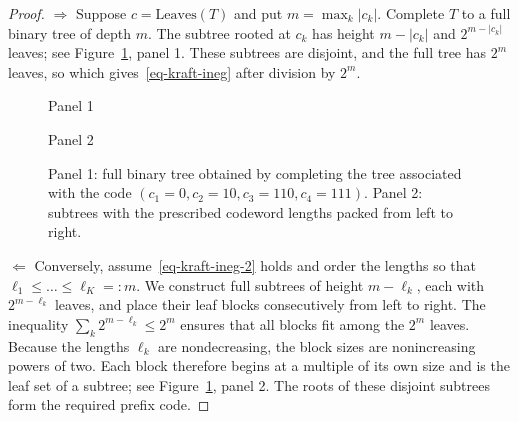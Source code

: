 \begin{proof}
	$\Rightarrow$ Suppose $c=\text{Leaves}(T)$ and put $m=\max_k |c_k|$. Complete $T$ to a full binary tree of depth $m$.
	The subtree rooted at $c_k$ has height $m-|c_k|$ and $2^{m-|c_k|}$ leaves; see Figure~\ref{fig-kraft-trees}, panel 1. These subtrees are disjoint, and the full tree has $2^m$ leaves, so
	which gives~\eqref{eq-kraft-ineg} after division by $2^m$.
	
	\begin{figure}[tbp]
\centering
{\small\sffamily\color{BookMuted}Panel 1\par}\smallskip
{}
\par\medskip
{\small\sffamily\color{BookMuted}Panel 2\par}\smallskip
{}
\caption{Panel 1: full binary tree obtained by completing the tree associated with the code $(c_1=0, c_2=10, c_3=110, c_4=111)$.
	Panel 2: subtrees with the prescribed codeword lengths packed from left to right.}
\label{fig-kraft-trees}
\end{figure}

	
	$\Leftarrow$ Conversely, assume~\eqref{eq-kraft-ineg-2} holds and order the lengths so that $\ell_1 \leq \ldots \leq \ell_K =: m$.
	We construct full subtrees of height $m-\ell_k$, each with $2^{m-\ell_k}$ leaves, and place their leaf blocks consecutively from left to right.
	The inequality $\sum_k 2^{m-\ell_k} \leq 2^m$ ensures that all blocks fit among the $2^m$ leaves.
	Because the lengths $\ell_k$ are nondecreasing, the block sizes are nonincreasing powers of two. Each block therefore begins at a multiple of its own size and is the leaf set of a subtree; see Figure~\ref{fig-kraft-trees}, panel 2. The roots of these disjoint subtrees form the required prefix code.
\end{proof}



